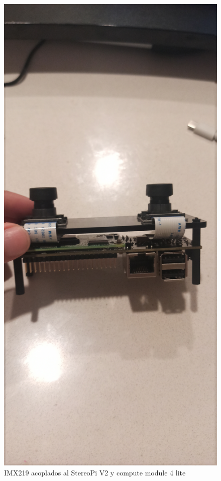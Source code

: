 \begin{enumerate}
    \begin{figure}[H]
        \centering
        \includegraphics[scale=0.05]{Recursos/module_installed.jpg}
        \caption{IMX219 acoplados al StereoPi V2 y compute module 4 lite}

\end{figure}
\end{enumerate}
